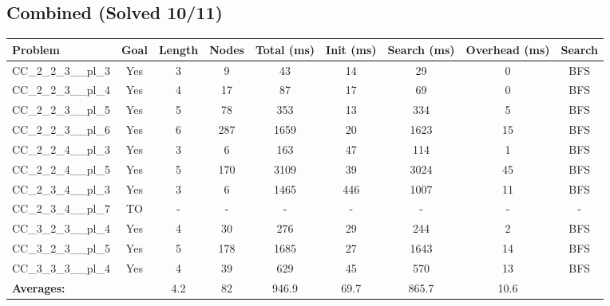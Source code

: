 \documentclass{article}
\begin{document}
\subsection*{Combined (Solved 10/11)}
\begin{tabular}{lcccccccc}
\toprule
Problem & Goal & Length & Nodes & Total (ms) & Init (ms) & Search (ms) & Overhead (ms) & Search \\
\midrule
CC\_2\_2\_3\_\_pl\_3 & Yes & 3 & 9 & 43 & 14 & 29 & 0 & BFS \\
CC\_2\_2\_3\_\_pl\_4 & Yes & 4 & 17 & 87 & 17 & 69 & 0 & BFS \\
CC\_2\_2\_3\_\_pl\_5 & Yes & 5 & 78 & 353 & 13 & 334 & 5 & BFS \\
CC\_2\_2\_3\_\_pl\_6 & Yes & 6 & 287 & 1659 & 20 & 1623 & 15 & BFS \\
CC\_2\_2\_4\_\_pl\_3 & Yes & 3 & 6 & 163 & 47 & 114 & 1 & BFS \\
CC\_2\_2\_4\_\_pl\_5 & Yes & 5 & 170 & 3109 & 39 & 3024 & 45 & BFS \\
CC\_2\_3\_4\_\_pl\_3 & Yes & 3 & 6 & 1465 & 446 & 1007 & 11 & BFS \\
CC\_2\_3\_4\_\_pl\_7 & TO & - & - & - & - & - & - & - \\
CC\_3\_2\_3\_\_pl\_4 & Yes & 4 & 30 & 276 & 29 & 244 & 2 & BFS \\
CC\_3\_2\_3\_\_pl\_5 & Yes & 5 & 178 & 1685 & 27 & 1643 & 14 & BFS \\
CC\_3\_3\_3\_\_pl\_4 & Yes & 4 & 39 & 629 & 45 & 570 & 13 & BFS \\
\textbf{Averages:} & & 4.2 & 82 & 946.9 & 69.7 & 865.7 & 10.6 & \\
\bottomrule
\end{tabular}
\\[0.7cm]
\end{document}
